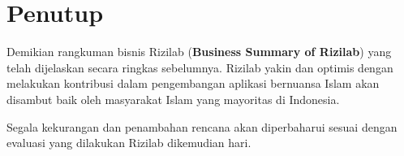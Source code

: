 \documentclass[Rizilab.tex]{subfile}
\begin{document}
  \section{Penutup}
   Demikian rangkuman bisnis Rizilab ({\bfseries Business Summary of Rizilab}) yang telah dijelaskan secara ringkas sebelumnya. Rizilab yakin dan optimis dengan melakukan kontribusi dalam pengembangan aplikasi bernuansa Islam akan disambut baik oleh masyarakat Islam yang mayoritas di Indonesia.

   Segala kekurangan dan penambahan rencana akan diperbaharui sesuai dengan evaluasi yang dilakukan Rizilab dikemudian hari.
\end{document}
